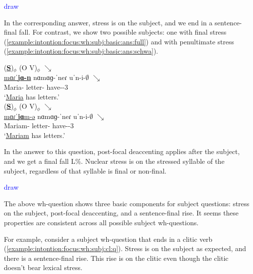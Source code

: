 \textcolor{blue}{draw}

In the corresponding answer, stress is on the subject, and we end in a sentence-final fall. For contrast, we show two possible subjects: one with final stress (\ref{example:intontion:focus:wh:subj:basic:ans:full}) and with penultimate stress (\ref{example:intontion:focus:wh:subj:basic:ans:schwa}). 

\begin{exe}
	\ex \begin{xlist}
		\ex \glll (\underline{\textbf{S}})$_\phi$ ({O} V)$_\phi$  $\searrow$ \\
		\underline{mɑɾˈ\textbf{jɑ-n}} nɑmɑɡ-ˈ{neɾ} uˈn-i-$\emptyset$  $\searrow$ \\
		Maria-{} letter-{\pl} have-{\thgloss}-3{\sg} \\
		\trans `\underline{Maria} has letters.' 
		\label{example:intontion:focus:wh:subj:basic:ans:full}
		\\ 
		\ex \glll (\underline{\textbf{S}})$_\phi$ ({O} V)$_\phi$  $\searrow$ \\
		\underline{mɑɾˈ\textbf{jɑ}m-ə} nɑmɑɡ-ˈ{neɾ} uˈn-i-$\emptyset$  $\searrow$ \\
		Mariam-{} letter-{\pl} have-{\thgloss}-3{\sg} \\
		\trans `\underline{Mariam} has letters.' 
		\label{example:intontion:focus:wh:subj:basic:ans:schwa}
		\\ 
		
	\end{xlist}
\end{exe}


In the answer to this question, post-focal deaccenting applies after the subject, and we get a final fall L\%.  Nuclear stress is on the stressed syllable of the subject, regardless of that syllable is final or non-final. 

\textcolor{blue}{draw}

The above wh-question shows three basic components for subject questions: stress on the subject, post-focal deaccenting, and a sentence-final rise. It seems these properties are consistent across all possible subject wh-questions. 

For example, consider a subject wh-question that ends in a clitic verb (\ref{example:intontion:focus:wh:subj:cl:q}). Stress is on the subject as expected, and there is a sentence-final rise. This rise is on the clitic even though the clitic doesn't bear lexical stress. 


